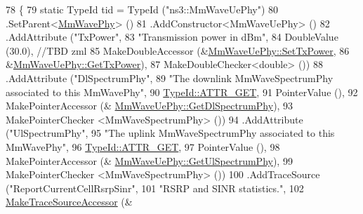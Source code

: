 \begin{DoxyCode}
78 \{
79         \textcolor{keyword}{static} TypeId tid = TypeId (\textcolor{stringliteral}{"ns3::MmWaveUePhy"})
80             .SetParent<\hyperlink{classns3_1_1MmWavePhy_a09ab3a0e8114e43dd531977bca8c5f97}{MmWavePhy}> ()
81             .AddConstructor<MmWaveUePhy> ()
82             .AddAttribute (\textcolor{stringliteral}{"TxPower"},
83                            \textcolor{stringliteral}{"Transmission power in dBm"},
84                            DoubleValue (30.0), \textcolor{comment}{//TBD zml}
85                            MakeDoubleAccessor (&\hyperlink{classns3_1_1MmWaveUePhy_ab3d07076a051efbb2516d784c937e5d7}{MmWaveUePhy::SetTxPower},
86                                                &\hyperlink{classns3_1_1MmWaveUePhy_a1824b34d73f79ea9037c604190ac6e99}{MmWaveUePhy::GetTxPower}),
87                            MakeDoubleChecker<double> ())
88                 .AddAttribute (\textcolor{stringliteral}{"DlSpectrumPhy"},
89                                             \textcolor{stringliteral}{"The downlink MmWaveSpectrumPhy associated to this MmWavePhy"},
90                                             \hyperlink{classns3_1_1TypeId_a3ab7b43b95f96391c514d609ca60e542a3dd4b476c9b257285c177d6c414b5fd0}{TypeId::ATTR\_GET},
91                                             PointerValue (),
92                                             MakePointerAccessor (&
      \hyperlink{classns3_1_1MmWaveUePhy_ae2a7d8583554822543d5b62a02e7c8db}{MmWaveUePhy::GetDlSpectrumPhy}),
93                                             MakePointerChecker <MmWaveSpectrumPhy> ())
94                 .AddAttribute (\textcolor{stringliteral}{"UlSpectrumPhy"},
95                                             \textcolor{stringliteral}{"The uplink MmWaveSpectrumPhy associated to this MmWavePhy"},
96                                             \hyperlink{classns3_1_1TypeId_a3ab7b43b95f96391c514d609ca60e542a3dd4b476c9b257285c177d6c414b5fd0}{TypeId::ATTR\_GET},
97                                             PointerValue (),
98                                             MakePointerAccessor (&
      \hyperlink{classns3_1_1MmWaveUePhy_ae691fc457a4262a8ad2674922592a6f4}{MmWaveUePhy::GetUlSpectrumPhy}),
99                                             MakePointerChecker <MmWaveSpectrumPhy> ())
100                 .AddTraceSource (\textcolor{stringliteral}{"ReportCurrentCellRsrpSinr"},
101                                                  \textcolor{stringliteral}{"RSRP and SINR statistics."},
102                                                  \hyperlink{group__tracing_gab21a770b9855af4e8f69f7531ea4a6b0}{MakeTraceSourceAccessor} (&

\end{DoxyCode}
